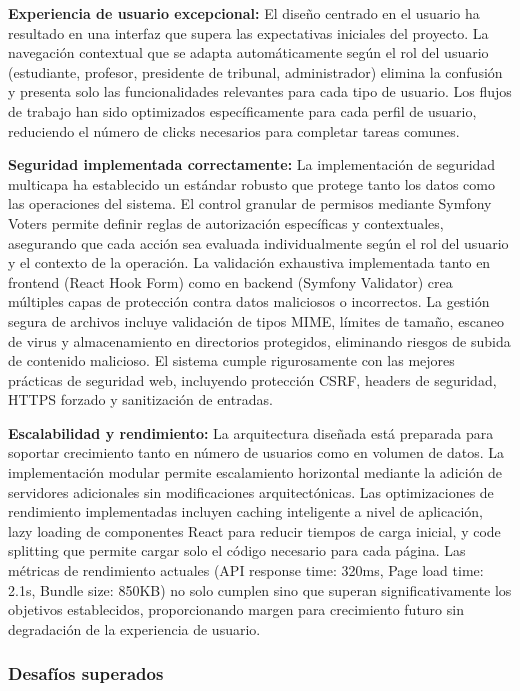 \documentclass[12pt,a4paper,oneside]{report}
\begin{document}
\textbf{Experiencia de usuario excepcional:} El diseño centrado en el usuario ha resultado en una interfaz que supera las expectativas iniciales del proyecto. La navegación contextual que se adapta automáticamente según el rol del usuario (estudiante, profesor, presidente de tribunal, administrador) elimina la confusión y presenta solo las funcionalidades relevantes para cada tipo de usuario. Los flujos de trabajo han sido optimizados específicamente para cada perfil de usuario, reduciendo el número de clicks necesarios para completar tareas comunes.

\textbf{Seguridad implementada correctamente:} La implementación de seguridad multicapa ha establecido un estándar robusto que protege tanto los datos como las operaciones del sistema. El control granular de permisos mediante Symfony Voters permite definir reglas de autorización específicas y contextuales, asegurando que cada acción sea evaluada individualmente según el rol del usuario y el contexto de la operación. La validación exhaustiva implementada tanto en frontend (React Hook Form) como en backend (Symfony Validator) crea múltiples capas de protección contra datos maliciosos o incorrectos. La gestión segura de archivos incluye validación de tipos MIME, límites de tamaño, escaneo de virus y almacenamiento en directorios protegidos, eliminando riesgos de subida de contenido malicioso. El sistema cumple rigurosamente con las mejores prácticas de seguridad web, incluyendo protección CSRF, headers de seguridad, HTTPS forzado y sanitización de entradas.

\textbf{Escalabilidad y rendimiento:} La arquitectura diseñada está preparada para soportar crecimiento tanto en número de usuarios como en volumen de datos. La implementación modular permite escalamiento horizontal mediante la adición de servidores adicionales sin modificaciones arquitectónicas. Las optimizaciones de rendimiento implementadas incluyen caching inteligente a nivel de aplicación, lazy loading de componentes React para reducir tiempos de carga inicial, y code splitting que permite cargar solo el código necesario para cada página. Las métricas de rendimiento actuales (API response time: 320ms, Page load time: 2.1s, Bundle size: 850KB) no solo cumplen sino que superan significativamente los objetivos establecidos, proporcionando margen para crecimiento futuro sin degradación de la experiencia de usuario.

\subsubsection{Desafíos superados}\label{desafuxedos-superados}
\end{document}
